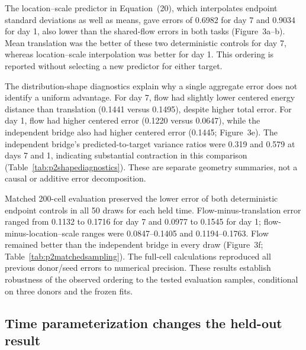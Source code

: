 \documentclass[10pt,a4paper]{article}
\begin{document}
The location--scale predictor in Equation~(20), which interpolates endpoint standard deviations as well as means, gave errors of 0.6982 for day 7 and 0.9034 for day 1, also lower than the shared-flow errors in both tasks (Figure~3a--b). Mean translation was the better of these two deterministic controls for day 7, whereas location--scale interpolation was better for day 1. This ordering is reported without selecting a new predictor for either target.

The distribution-shape diagnostics explain why a single aggregate error does not identify a uniform advantage. For day 7, flow had slightly lower centered energy distance than translation (0.1441 versus 0.1495), despite higher total error. For day 1, flow had higher centered error (0.1220 versus 0.0647), while the independent bridge also had higher centered error (0.1445; Figure~3e). The independent bridge's predicted-to-target variance ratios were 0.319 and 0.579 at days 7 and 1, indicating substantial contraction in this comparison (Table~\ref{tab:p2shapediagnostics}). These are separate geometry summaries, not a causal or additive error decomposition.

Matched 200-cell evaluation preserved the lower error of both deterministic endpoint controls in all 50 draws for each held time. Flow-minus-translation error ranged from 0.1132 to 0.1716 for day 7 and 0.0977 to 0.1545 for day 1; flow-minus-location--scale ranges were 0.0847--0.1405 and 0.1194--0.1763. Flow remained better than the independent bridge in every draw (Figure~3f; Table~\ref{tab:p2matchedsampling}). The full-cell calculations reproduced all previous donor/seed errors to numerical precision. These results establish robustness of the observed ordering to the tested evaluation samples, conditional on three donors and the frozen fits.

\subsection{Time parameterization changes the held-out result}
\end{document}

